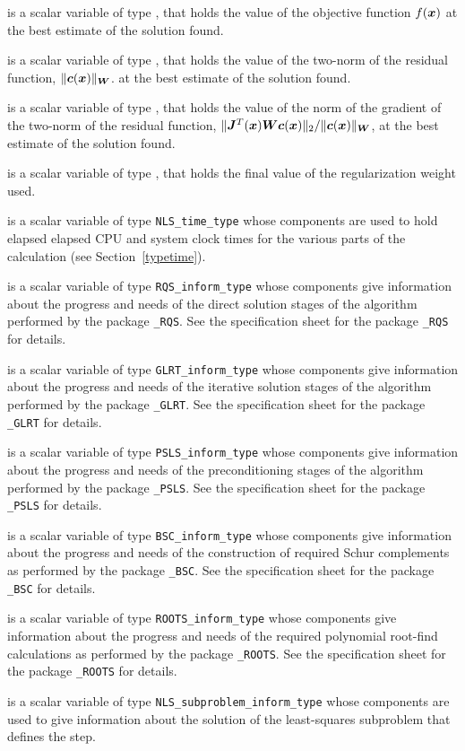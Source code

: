 \documentclass{galahad}
\newcommand{\packagename}{NLS}
\begin{document}
\begin{description}
 is a scalar variable of type \realdp, that holds the
value of the objective function $f({\bm{x}})$  at the best estimate
of the solution found.

 is a scalar variable of type \realdp, that holds the
value of the two-norm of the residual function, $\|{\bm{c}}({\bm{x}})\|_{{\bm{W}}}$.
at the best estimate of the solution found.

 is a scalar variable of type \realdp, that holds the
value of the norm of the gradient of the two-norm of the residual function,
$\|{\bm{J}}^T({\bm{x}}) {\bm{W}} {\bm{c}}({\bm{x}})\|_2/\|{\bm{c}}({\bm{x}})\|_{{\bm{W}}}$, at the best estimate
of the solution found.

 is a scalar variable of type \realdp, that holds the
final value of the regularization weight used.

 is a scalar variable of type {\tt \packagename\_time\_type}
whose components are used to hold elapsed elapsed CPU and system clock
times for the various parts of the calculation (see Section~\ref{typetime}).

 is a scalar variable of type
{\tt RQS\_inform\_type}
whose components give information about the progress and needs
of the direct solution stages of the algorithm performed by the package
{\tt \libraryname\_RQS}.
See the specification sheet for the package
{\tt \libraryname\_RQS}
for details.

 is a scalar variable of type
{\tt GLRT\_inform\_type}
whose components give information about the progress and needs
of the iterative solution stages of the algorithm performed by the package
{\tt \libraryname\_GLRT}.
See the specification sheet for the package
{\tt \libraryname\_GLRT}
for details.

 is a scalar variable of type
{\tt PSLS\_inform\_type}
whose components give information about the progress and needs
of the preconditioning stages of the algorithm performed by the package
{\tt \libraryname\_PSLS}.
See the specification sheet for the package
{\tt \libraryname\_PSLS} for details.

 is a scalar variable of type
{\tt BSC\_inform\_type}
whose components give information about the progress and needs
of the construction of required Schur complements
as performed by the package
{\tt \libraryname\_BSC}.
See the specification sheet for the package
{\tt \libraryname\_BSC} for details.

 is a scalar variable of type
{\tt ROOTS\_inform\_type}
whose components give information about the progress and needs
of the required polynomial root-find calculations
as performed by the package
{\tt \libraryname\_ROOTS}.
See the specification sheet for the package
{\tt \libraryname\_ROOTS} for details.

  is a scalar variable of type
{\tt \packagename\_subproblem\_inform\_type}
whose components are used to give information about the solution of the
least-squares subproblem that defines the step.
\end{description}
\end{document}
